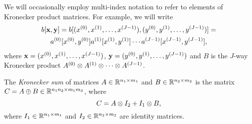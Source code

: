We will occasionally employ multi-index notation to refer to elements
of Kronecker product matrices. For example, we will write
\begin{multline}
  b[\bm{\mathrm{x}}, \bm{\mathrm{y}}] = b[(x^{(0)}, x^{(1)}, \ldots, x^{(J -
    1)}), (y^{(0)}, y^{(1)}, \ldots, y^{(J - 1)})] = \\
  a^{(0)}[x^{(0)}, y^{(0)}] a^{(1)}[x^{(1)},
  y^{(1)}] \cdots a^{(J - 1)}[x^{(J - 1)}, y^{(J - 1)}]
  \text,
\end{multline}
where $\bm{\mathrm{x}} = (x^{(0)}, x^{(1)}, \ldots, x^{(J - 1)})$,
$\bm{\mathrm{y}} = (y^{(0)}, y^{(1)}, \ldots, y^{(J - 1)})$ and $B$
is the $J$-way Kronecker product
$A^{(0)} \otimes A^{(1)} \otimes \cdots \otimes A^{(J -
  1)}$.

\begin{dfn}
  The \emph{Kronecker sum} of matrices
  $A \in \mathbb{R}^{n_1 \times m_1}$ and $B \in \mathbb{R}^{n_2 \times m_2}$ is the
  matrix $C = A \oplus B \in \mathbb{R}^{n_1 n_2 \times m_1 m_3}$, where
  \begin{equation}
    C = A \otimes I_2 + I_1 \otimes B \text,
  \end{equation}
  where $I_1 \in \mathbb{R}^{n_1 \times m_1}$ and $I_2 \in \mathbb{R}^{n_2 \times
    m_2}$ are identity matrices.
\end{dfn}

